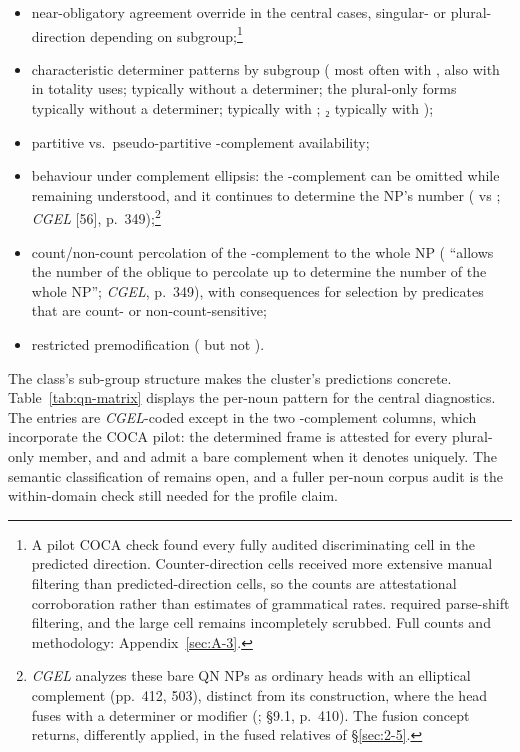 \begin{itemize}
\item
  near-obligatory agreement override in the central cases, singular- or plural-direction depending on subgroup;\footnote{A pilot COCA check found every fully audited discriminating cell in the predicted direction. Counter-direction cells received more extensive manual filtering than predicted-direction cells, so the counts are attestational corroboration rather than estimates of grammatical rates.  required parse-shift filtering, and the large  cell remains incompletely scrubbed. Full counts and methodology: Appendix~\ref{sec:A-3}.}
\item
  characteristic determiner patterns by subgroup ( most often with , also with  in totality uses;  typically without a determiner; the plural-only forms typically without a determiner;  typically with ; ₂ typically with );
\item
  partitive vs.~pseudo-partitive -complement availability;
\item
  behaviour under complement ellipsis: the -complement can be omitted while remaining understood, and it continues to determine the NP's number ( vs ; \textit{CGEL} [56], p.~349);\footnote{\textit{CGEL} analyzes these bare QN NPs as ordinary heads with an elliptical complement (pp.~412, 503), distinct from its  construction, where the head fuses with a determiner or modifier (; §9.1, p.~410). The fusion concept returns, differently applied, in the fused relatives of §\ref{sec:2-5}.}
\item
  count/non-count percolation of the -complement to the whole NP ( \enquote{allows the number of the oblique to percolate up to determine the number of the whole NP}; \textit{CGEL}, p.~349), with consequences for selection by predicates that are count- or non-count-sensitive;
\item
  restricted premodification ( but not ).
\end{itemize}

The class's sub-group structure makes the cluster's predictions concrete. Table~\ref{tab:qn-matrix} displays the per-noun pattern for the central diagnostics. The entries are \textit{CGEL}-coded except in the two -complement columns, which incorporate the COCA pilot: the determined frame is attested for every plural-only member, and  and  admit a bare complement when it denotes uniquely. The semantic classification of  remains open, and a fuller per-noun corpus audit is the within-domain check still needed for the profile claim.

